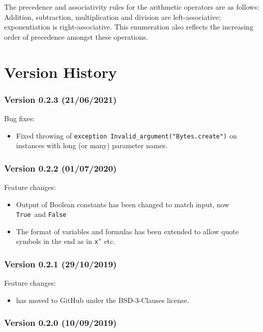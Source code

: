 \documentclass[twoside]{article}
\begin{document}
The precedence and associativity rules for the arithmetic operators are as follows: Addition, subtraction, multiplication and division are left-associative; exponentiation is 
right-associative. This enumeration also reflects the increasing order of precedence amongst these operations.


\section{Version History}


\subsubsection*{Version 0.2.3 (21/06/2021)}

Bug fixes:
\begin{itemize}
\item Fixed throwing of \texttt{exception Invalid_argument("Bytes.create")} on instances with long (or many) parameter names.
\end{itemize}

\subsubsection*{Version 0.2.2 (01/07/2020)}

Feature changes:
\begin{itemize}
\item Output of Boolean constants has been changed to match input, now \texttt{True} and \texttt{False}
\item The format of variables and formulas has been extended to allow quote symbols in the end as in \texttt{x'} etc.
\end{itemize}

\subsubsection*{Version 0.2.1 (29/10/2019)}

Feature changes:
\begin{itemize}
\item \DiMo has moved to GitHub under the BSD-3-Clauses license.
\end{itemize}


\subsubsection*{Version 0.2.0 (10/09/2019)}
\end{document}
